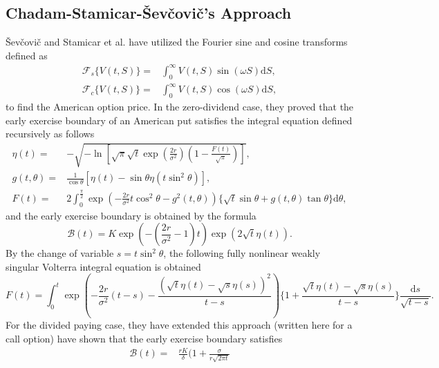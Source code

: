 \documentclass[fleqn,final,3p,11pt]{elsarticle}
\theoremstyle{definition}
\theoremstyle{remark}
\numberwithin{equation}{section}
\begin{document}
\begin{appendices}
\subsection{Chadam-Stamicar-\v{S}ev\v{c}ovi\v{c}'s Approach}
\v{S}ev\v{c}ovi\v{c} \cite{shev2} and Stamicar et al. \cite{stamicar}  have utilized  the Fourier sine and cosine transforms defined as
\begin{align*}
\mathcal{F}_{s}\{ V(t, S)\} = &\int_{0}^{\infty}V(t, S)\sin(\omega S)\mathrm{d}S,\\
\mathcal{F}_{c}\{ V(t, S)\} = &\int_{0}^{\infty}V(t, S)\cos(\omega S)\mathrm{d}S,\end{align*}
to find the
American  option price. In the zero-dividend case, they proved that  the early exercise boundary of an American put satisfies the integral equation  defined recursively as follows
\begin{equation}\label{Aa2}
\begin{split}
  \eta (t) = & - \sqrt{- \ln \left[ \sqrt{\pi} \sqrt{t} \exp \left( \frac{2r}{\sigma^{2}}\right) \left(1- \frac{F(t)}{\sqrt{\pi}} \right)   \right]},\\
 g(t, \theta) = & \frac{1}{\cos \theta} \left[ \eta (t) -\sin \theta \eta (t \sin^{2}\theta) \right],\\
 F(t)  = & 2\int_{0}^{\frac{\pi}{2}} \exp \left( -  \frac{2r}{\sigma^{2}} t \cos^{2} \theta - g^{2}(t, \theta) \right) \Big\{ \sqrt{t} \sin \theta + g(t, \theta)\tan \theta\Big\} \mathrm{d}\theta,
\end{split}
\end{equation}
and the early exercise boundary is obtained by the formula  \[\mathcal{B}(t) = K \exp \left( - \left( \frac{2r}{\sigma^{2}}-1\right) t \right) \exp \left( 2 \sqrt{t} \eta (t)\right).\]
By the change of variable $s= t \sin^{2} \theta $, the following fully nonlinear weakly singular Volterra integral equation is obtained
\begin{equation} \label{shevin}F (t) =  \int_{0}^{t}\exp \left( -  \frac{2r}{\sigma^{2}} (t-s) - \frac{(\sqrt{t}\eta (t) - \sqrt{s}\eta (s))^{2}}{t-s} \right)  \Big\{ 1+ \frac{\sqrt{t}\eta (t) - \sqrt{s}\eta (s)}{t-s} \Big\} \frac{\mathrm{d}s}{\sqrt{t-s}}.\end{equation}
For the divided paying case,  they have extended this approach (written here for a call option) have shown that the early exercise boundary satisfies
\begin{equation}\label{shevon}
\begin{split}
\mathcal{B}(t) = & \frac{r K}{\delta} \Big( 1+ \frac{\sigma}{r \sqrt{2\pi t}}

\end{split}
\end{equation}
\end{appendices}
\end{document}
